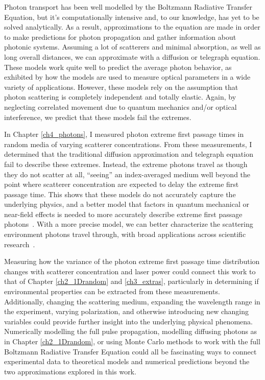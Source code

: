 Photon transport has been well modelled by the Boltzmann Radiative Transfer Equation, but it's computationally intensive and, to our knowledge, has yet to be solved analytically. As a result, approximations to the equation are made in order to make predictions for photon propagation and gather information about photonic systems. Assuming a lot of scatterers and minimal absorption, as well as long overall distances, we can approximate with a diffusion or telegraph equation. These models work quite well to predict the average photon behavior, as exhibited by how the models are used to measure optical parameters in a wide variety of applications. However, these models rely on the assumption that photon scattering is completely independent and totally elastic. Again, by neglecting correlated movement due to quantum mechanics and/or optical interference, we predict that these models fail the extremes.

In Chapter \ref{ch4_photons}, I measured photon extreme first passage times in random media of varying scatterer concentrations. From these measurements, I determined that the traditional diffusion approximation and telegraph equation fail to describe these extremes. Instead, the extreme photons travel as though they do not scatter at all, ``seeing'' an index-averaged medium well beyond the point where scatterer concentration are expected to delay the extreme first passage time. This shows that these models do not accurately capture the underlying physics, and a better model that factors in quantum mechanical or near-field effects is needed to more accurately describe extreme first passage photons~\cite{pattelli_role_2018,pini_non-self-similar_2024}. With a more precise model, we can better characterize the scattering environment photons travel through, with broad applications across scientific research~\cite{allgaier_diffuse_2021,amendola_accuracy_2021,taitelbaum_diagnosis_1999,bohren_absorption_1983}. 

Measuring how the variance of the photon extreme first passage time distribution changes with scatterer concentration and laser power could connect this work to that of Chapter \ref{ch2_1Drandom} and \ref{ch3_extras}, particularly in determining if environmental properties can be extracted from these measurements. Additionally, changing the scattering medium, expanding the wavelength range in the experiment, varying polarization, and otherwise introducing new changing variables could provide further insight into the underlying physical phenomena. Numerically modelling the full pulse propagation, modelling diffusing photons as in Chapter \ref{ch2_1Drandom}, or using Monte Carlo methods to work with the full Boltzmann Radiative Transfer Equation could all be fascinating ways to connect experimental data to theoretical models and numerical predictions beyond the two approximations explored in this work.

